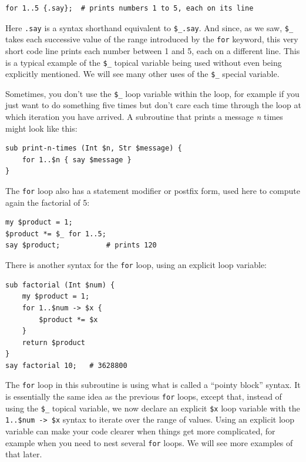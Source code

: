 \begin{verbatim}
for 1..5 {.say};  # prints numbers 1 to 5, each on its line
\end{verbatim} 

Here {\tt .say} is a syntax shorthand equivalent to \verb"$_.say". 
And since, as we saw, \verb"$_" takes each successive value of 
the range introduced by the {\tt for} keyword, this very short code 
line prints each number between 1 and 5, each on a different line. 
This is a typical example of the \verb"$_" topical variable being used 
without even being explicitly mentioned. We will see many other 
uses of the \verb"$_" special variable. 

Sometimes, you don't use the \verb"$_" loop variable within the 
loop, for example if you just want to do something five times but don't 
care each time through the loop at which iteration you 
have arrived. A subroutine that prints a message \emph{n} times 
might look like this:

\begin{verbatim}
sub print-n-times (Int $n, Str $message) {
    for 1..$n { say $message }
} 
\end{verbatim} 


The {\tt for} loop also has a statement modifier or postfix form, 
used here to compute again the factorial of 5:

\begin{verbatim}
my $product = 1;
$product *= $_ for 1..5;
say $product;           # prints 120
\end{verbatim} 

There is another syntax for the {\tt for} loop, using an explicit loop variable:

\begin{verbatim}
sub factorial (Int $num) { 
    my $product = 1;  
    for 1..$num -> $x { 
        $product *= $x
    }
    return $product
}
say factorial 10;   # 3628800
\end{verbatim} 

The {\tt for} loop in this subroutine is using what is called 
a ``pointy block'' syntax. It is essentially the same idea 
as the previous {\tt for} loops, except that, 
instead of using the \verb"$_" topical variable, we 
now declare an explicit \verb"$x" loop variable with the 
\verb"1..$num -> $x" syntax to iterate over the range 
of values. Using an explicit loop variable can make your 
code clearer when things get more complicated, for example 
when you need to nest several {\tt for} loops. We will 
see more examples of that later.

